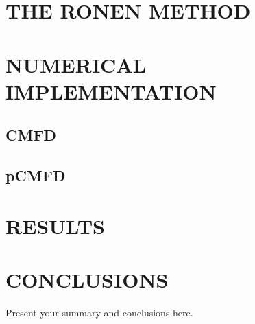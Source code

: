 \documentclass[letterpaper]{physor2020}
\begin{document}
\section{THE RONEN METHOD}
\label{sec:RM}

\section{NUMERICAL IMPLEMENTATION}
\label{sec:RM-num}

\subsection{CMFD}
\label{sec:RM-CMFD}

\subsection{pCMFD}
\label{sec:RM-pCMFD}


\section{RESULTS}
\label{sec:res}


\section{CONCLUSIONS}
\label{sec:conc}

Present your summary and conclusions here.


\end{document}
